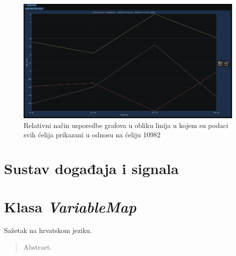 \documentclass[times, utf8, diplomski]{fer}
\begin{document}
\begin{figure}[H]
	\centering
	\includegraphics[width=\textwidth]{relative_graph_display_lines_cell_10982.png}
	\caption{Relativni način usporedbe grafova u obliku linija u kojem su podaci svih ćelija prikazani u odnosu na ćeliju 10982}
    \label{appendix:relative_graph_display_lines}
\end{figure}

\chapter{Sustav događaja i signala} \label{appendix:event-signal-system}

\chapter{Klasa \textit{VariableMap}} \label{appendix:variablemap-class}

\begin{sazetak}
Sažetak na hrvatskom jeziku.

\end{sazetak}

\begin{abstract}
Abstract.

\end{abstract}
\end{document}
